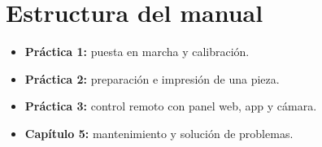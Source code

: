 \section{Estructura del manual}

\begin{itemize}
    \item \textbf{Práctica 1:} puesta en marcha y calibración.
    \item \textbf{Práctica 2:} preparación e impresión de una pieza.
    \item \textbf{Práctica 3:} control remoto con panel web, app y cámara.
    \item \textbf{Capítulo 5:} mantenimiento y solución de problemas.
\end{itemize}
